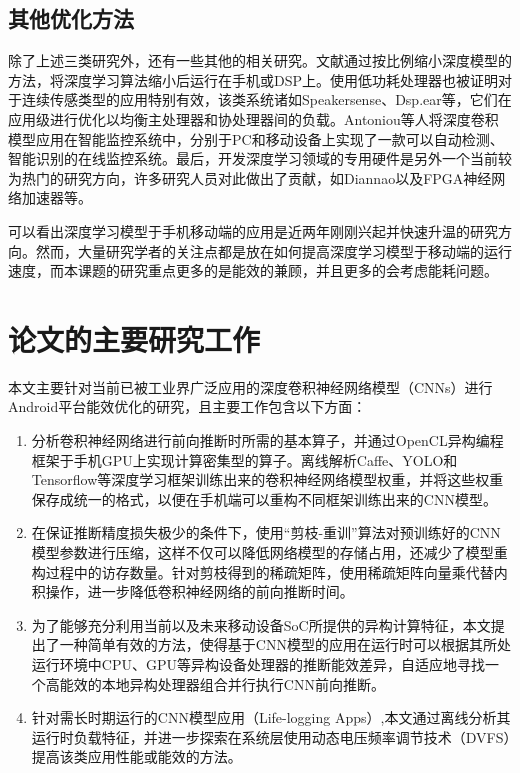 \subsection{其他优化方法}
除了上述三类研究外，还有一些其他的相关研究。文献\cite{lane2015deepear,chen2014small,variani2014deep}通过按比例缩小深度模型的方法，将深度学习算法缩小后运行在手机或DSP上。使用低功耗处理器也被证明对于连续传感类型的应用特别有效，该类系统诸如Speakersense\cite{lu2011speakersense}、Dsp.ear\cite{georgiev2014dsp}等，它们在应用级进行优化以均衡主处理器和协处理器间的负载。Antoniou等人\cite{antoniou2016general}将深度卷积模型应用在智能监控系统中，分别于PC和移动设备上实现了一款可以自动检测、智能识别的在线监控系统。最后，开发深度学习领域的专用硬件是另外一个当前较为热门的研究方向，许多研究人员对此做出了贡献，如Diannao\cite{chen2014diannao}以及FPGA神经网络加速器\cite{zhang2015optimizing,wang2017dlau,yu2015deep,wang2016solar}等。

可以看出深度学习模型于手机移动端的应用是近两年刚刚兴起并快速升温的研究方向。然而，大量研究学者的关注点都是放在如何提高深度学习模型于移动端的运行速度，而本课题的研究重点更多的是能效的兼顾，并且更多的会考虑能耗问题。

\section{论文的主要研究工作}
本文主要针对当前已被工业界广泛应用的深度卷积神经网络模型（CNNs）进行Android平台能效优化的研究，且主要工作包含以下方面：
\begin{enumerate}
\item 分析卷积神经网络进行前向推断时所需的基本算子，并通过OpenCL异构编程框架于手机GPU上实现计算密集型的算子。离线解析Caffe、YOLO\cite{redmon2016you}和Tensorflow\cite{abadi2016tensorflow}等深度学习框架训练出来的卷积神经网络模型权重，并将这些权重保存成统一的格式，以便在手机端可以重构不同框架训练出来的CNN模型。
\item 在保证推断精度损失极少的条件下，使用“剪枝-重训”算法对预训练好的CNN模型参数进行压缩，这样不仅可以降低网络模型的存储占用，还减少了模型重构过程中的访存数量。针对剪枝得到的稀疏矩阵，使用稀疏矩阵向量乘代替内积操作，进一步降低卷积神经网络的前向推断时间。
\item 为了能够充分利用当前以及未来移动设备SoC所提供的异构计算特征，本文提出了一种简单有效的方法，使得基于CNN模型的应用在运行时可以根据其所处运行环境中CPU、GPU等异构设备处理器的推断能效差异，自适应地寻找一个高能效的本地异构处理器组合并行执行CNN前向推断。
\item 针对需长时期运行的CNN模型应用（Life-logging Apps）,本文通过离线分析其运行时负载特征，并进一步探索在系统层使用动态电压频率调节技术（DVFS）\cite{le2010dynamic}提高该类应用性能或能效的方法。
\end{enumerate}

